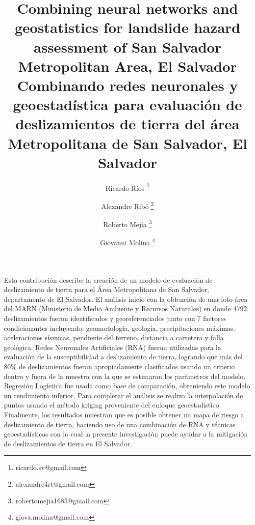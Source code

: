 \documentclass[11pt,twoside]{rmta2010eng}%
\begin{document}
\title{Combining neural networks and geostatistics for landslide hazard assessment of San Salvador Metropolitan Area, El Salvador 
\newline
\newline
Combinando redes neuronales y geoestad\'{i}stica para evaluaci\'{o}n de deslizamientos de tierra del \'{a}rea Metropolitana de San Salvador, El Salvador}

\author[1]{Ricardo R\'{i}os \thanks{ricardo.sv@gmail.com}}
\author[2]{Alexandre Rib\'{o} \thanks{alexandre4rt@gmail.com}}
\author[3]{Roberto Mej\'{i}a \thanks{robertomejia1685@gmail.com}}
\author[4]{Giovanni Molina \thanks{giova.molina@gmail.com}}


\date{}

\maketitle



\begin{resumen}
Esta contribuci\'{o}n describe la creaci\'{o}n de un modelo de evaluaci\'{o}n de deslizamiento de tierra para el \'{A}rea Metropolitana de San Salvador, departamento de El Salvador. El an\'{a}lisis inicio con la obtenci\'{o}n de una foto \'{a}rea del MARN (Ministerio de Medio Ambiente y Recursos Naturales) en donde 4792 deslizamientos fueron identificados y georeferenciados junto con 7 factores condicionantes incluyendo: geomorfolog\'{i}a, geolog\'{i}a, precipitaciones m\'{a}ximas, aceleraciones s\'{i}smicas, pendiente del terreno, distancia a carretera y falla geol\'{o}gica. Redes Neuronales Artificiales (RNA) fueron utilizadas para la evaluaci\'{o}n de la susceptibilidad a deslizamiento de tierra, logrando que m\'{a}s del 80\% de deslizamientos fueran apropiadamente clasificados usando un criterio dentro y fuera de la muestra con la que se estimaron los par\'{a}metros del modelo. Regresi\'{o}n Log\'{i}stica fue usada como base de comparaci\'{o}n, obteniendo este modelo un rendimiento inferior. Para completar el an\'{a}lisis se realizo la interpolaci\'{o}n de puntos usando el m\'{e}todo kriging proveniente del enfoque geoestad\'{i}stico. Finalmente, los resultados muestran que es posible obtener un mapa de riesgo a deslizamiento de tierra, haciendo uso de una combinaci\'{o}n de RNA y t\'{e}cnicas geoestad\'{i}sticas con lo cual la presente investigaci\'{o}n puede ayudar a la mitigaci\'{o}n de deslizamientos de tierra en El Salvador.
\end{resumen}
\end{document}
